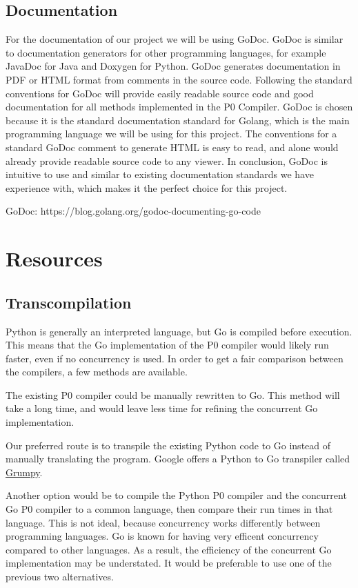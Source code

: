 \documentclass{article}
\begin{document}
\subsection{Documentation} %

For the documentation of our project we will be using GoDoc. GoDoc is similar to documentation 
generators for other programming languages, for example JavaDoc for Java and Doxygen for Python. 
GoDoc generates documentation in PDF or HTML format from comments in the source code. 
Following the standard conventions for GoDoc will provide easily readable source code and good 
documentation for all methods implemented in the P0 Compiler. GoDoc is chosen because it is the standard documentation standard for Golang, 
which is the main programming language we will be using for this project. The conventions for a standard GoDoc comment to generate HTML
 is easy to read, and alone would already provide readable source code to any viewer. 
 In conclusion, GoDoc is intuitive to use and similar to existing documentation standards we have experience with, 
 which makes it the perfect choice for this project.
 
GoDoc: https://blog.golang.org/godoc-documenting-go-code

\section{Resources}

\subsection{Transcompilation} %

Python is generally an interpreted language, but Go is compiled before execution.
This means that the Go implementation of the P0 compiler would likely run
faster, even if no concurrency is used.
In order to get a fair comparison between the compilers, a few methods are
available.

The existing P0 compiler could be manually rewritten to Go.
This method will take a long time, and would leave less time for refining the
concurrent Go implementation.

Our preferred route is to transpile the existing Python code to Go instead of
manually translating the program.
Google offers a Python to Go transpiler called
\href{https://github.com/google/grumpy}{Grumpy}.

Another option would be to compile the Python P0 compiler and the concurrent Go
P0 compiler to a common language, then compare their run times in that 
language.
This is not ideal, because concurrency works differently between programming
languages.
Go is known for having very efficent concurrency compared to other languages.
As a result, the efficiency of the concurrent Go implementation may be
understated.
It would be preferable to use one of the previous two alternatives.
\end{document}
